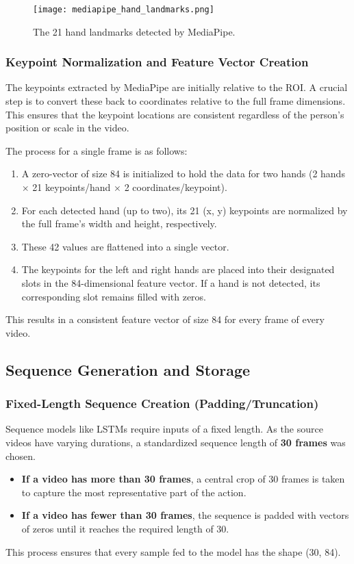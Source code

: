 \documentclass[11pt, a4paper]{article}
\begin{document}
\begin{figure}[H]
    \centering
    \texttt{[image: mediapipe\_hand\_landmarks.png]} %
    \caption{The 21 hand landmarks detected by MediaPipe.}
    \label{fig:mediapipe_hands}
\end{figure}

\subsubsection{Keypoint Normalization and Feature Vector Creation}
The keypoints extracted by MediaPipe are initially relative to the ROI. A crucial step is to convert these back to coordinates relative to the full frame dimensions. This ensures that the keypoint locations are consistent regardless of the person's position or scale in the video.

The process for a single frame is as follows:
\begin{enumerate}
    \item A zero-vector of size 84 is initialized to hold the data for two hands (2 hands $\times$ 21 keypoints/hand $\times$ 2 coordinates/keypoint).
    \item For each detected hand (up to two), its 21 (x, y) keypoints are normalized by the full frame's width and height, respectively.
    \item These 42 values are flattened into a single vector.
    \item The keypoints for the left and right hands are placed into their designated slots in the 84-dimensional feature vector. If a hand is not detected, its corresponding slot remains filled with zeros.
\end{enumerate}
This results in a consistent feature vector of size 84 for every frame of every video.

\subsection{Sequence Generation and Storage}
\subsubsection{Fixed-Length Sequence Creation (Padding/Truncation)}
Sequence models like LSTMs require inputs of a fixed length. As the source videos have varying durations, a standardized sequence length of \textbf{30 frames} was chosen.
\begin{itemize}
    \item \textbf{If a video has more than 30 frames}, a central crop of 30 frames is taken to capture the most representative part of the action.
    \item \textbf{If a video has fewer than 30 frames}, the sequence is padded with vectors of zeros until it reaches the required length of 30.
\end{itemize}
This process ensures that every sample fed to the model has the shape (30, 84).
\end{document}
